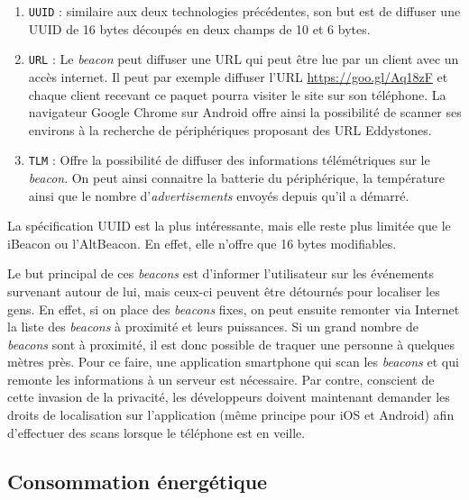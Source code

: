 \begin{enumerate}
\begin{enumerate}
        \item \texttt{UUID} : similaire aux deux technologies précédentes, son but est de diffuser une UUID de 16 bytes découpés en deux champs de 10 et 6 bytes.
        \item \texttt{URL} : Le \textit{beacon} peut diffuser une URL qui peut être lue par un client avec un accès internet. Il peut par exemple diffuser l'URL \url{https://goo.gl/Aq18zF} et chaque client recevant ce paquet pourra visiter le site sur son téléphone. La navigateur Google Chrome sur Android offre ainsi la possibilité de scanner ses environs à la recherche de périphériques proposant des URL Eddystones.
        \item \texttt{TLM} : Offre la possibilité de diffuser des informations télémétriques sur le \textit{beacon}. On peut ainsi connaitre la batterie du périphérique, la température ainsi que le nombre d'\textit{advertisements} envoyés depuis qu'il a démarré. 
    \end{enumerate}
    La spécification UUID est la plus intéressante, mais elle reste plus limitée que le iBeacon ou l'AltBeacon. En effet, elle n'offre que 16 bytes modifiables.
\end{enumerate}



Le but principal de ces \textit{beacons} est d'informer l'utilisateur sur les événements survenant autour de lui, mais ceux-ci peuvent être détournés pour localiser les gens. En effet, si on place des \textit{beacons} fixes, on peut ensuite remonter via Internet la liste des \textit{beacons} à proximité et leurs puissances. Si un grand nombre de \textit{beacons} sont à proximité, il est donc possible de traquer une personne à quelques mètres près. Pour ce faire, une application smartphone qui scan les \textit{beacons} et qui remonte les informations à un serveur est nécessaire. Par contre, conscient de cette invasion de la privacité, les développeurs doivent maintenant demander les droits de localisation sur l'application (même principe pour iOS et Android) afin d'effectuer des scans lorsque le téléphone est en veille.

\FloatBarrier



\subsection{Consommation énergétique}


